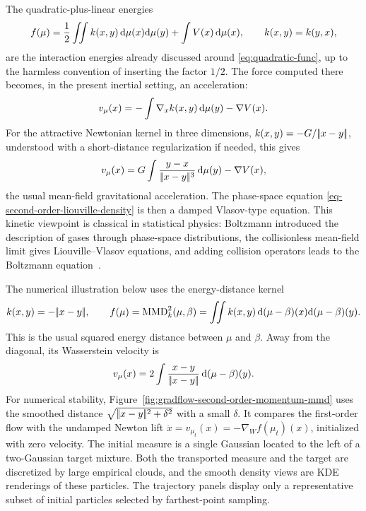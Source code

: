 \begin{example}\label{ex-quadratic-momentum-gravity}
	The quadratic-plus-linear energies
	\[
		f(\mu)=\frac12\iint k(x,y)\,\mathrm{d}\mu(x)\mathrm{d}\mu(y)+\int V(x)\,\mathrm{d}\mu(x),
		\qquad k(x,y)=k(y,x),
	\]
	are the interaction energies already discussed around \eqref{eq:quadratic-func}, up to the harmless convention of inserting the factor $1/2$. The force computed there becomes, in the present inertial setting, an acceleration:
	\[
		v_\mu(x)
		=
		-\int \nabla_x k(x,y)\,\mathrm{d}\mu(y)-\nabla V(x).
	\]
	For the attractive Newtonian kernel in three dimensions, $k(x,y)=-G/|\!| x-y |\!|$, understood with a short-distance regularization if needed, this gives
	\[
		v_\mu(x)
		=
		G\int \frac{y-x}{|\!| x-y |\!|^3}\,\mathrm{d}\mu(y)-\nabla V(x),
	\]
	the usual mean-field gravitational acceleration. The phase-space equation \eqref{eq-second-order-liouville-density} is then a damped Vlasov-type equation. This kinetic viewpoint is classical in statistical physics: Boltzmann introduced the description of gases through phase-space distributions, the collisionless mean-field limit gives Liouville--Vlasov equations, and adding collision operators leads to the Boltzmann equation~\cite{CercignaniIllnerPulvirenti1994DiluteGases,Villani2002Boltzmann,BraunHepp1977Vlasov}.
\end{example}

The numerical illustration below uses the energy-distance kernel
\[
	k(x,y)=-|\!| x-y |\!|,
	\qquad
	f(\mu)=\operatorname{MMD}_k^2(\mu,\beta)
	=
	\iint k(x,y)\,\mathrm{d}(\mu-\beta)(x)\mathrm{d}(\mu-\beta)(y).
\]
This is the usual squared energy distance between $\mu$ and $\beta$. Away from the diagonal, its Wasserstein velocity is
\[
	v_\mu(x)
	=
	2\int \frac{x-y}{|\!| x-y |\!|}\,\mathrm{d}(\mu-\beta)(y).
\]
For numerical stability, Figure~\ref{fig:gradflow-second-order-momentum-mmd} uses the smoothed distance $\sqrt{|\!| x-y |\!|^2+\delta^2}$ with a small $\delta$. It compares the first-order flow with the undamped Newton lift $\ddot x=v_{\mu_t}(x)=-\nabla_W f(\mu_t)(x)$, initialized with zero velocity. The initial measure is a single Gaussian located to the left of a two-Gaussian target mixture. Both the transported measure and the target are discretized by large empirical clouds, and the smooth density views are KDE renderings of these particles. The trajectory panels display only a representative subset of initial particles selected by farthest-point sampling.

